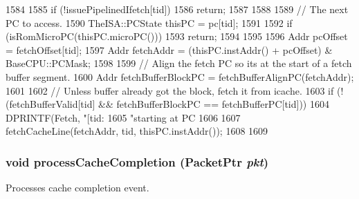 \begin{DoxyCode}
1584 {
1585     if (!issuePipelinedIfetch[tid]) {
1586         return;
1587     }
1588 
1589     // The next PC to access.
1590     TheISA::PCState thisPC = pc[tid];
1591 
1592     if (isRomMicroPC(thisPC.microPC())) {
1593         return;
1594     }
1595 
1596     Addr pcOffset = fetchOffset[tid];
1597     Addr fetchAddr = (thisPC.instAddr() + pcOffset) & BaseCPU::PCMask;
1598 
1599     // Align the fetch PC so its at the start of a fetch buffer segment.
1600     Addr fetchBufferBlockPC = fetchBufferAlignPC(fetchAddr);
1601 
1602     // Unless buffer already got the block, fetch it from icache.
1603     if (!(fetchBufferValid[tid] && fetchBufferBlockPC == fetchBufferPC[tid])) {
1604         DPRINTF(Fetch, "[tid:%
1605                 "starting at PC %
1606 
1607         fetchCacheLine(fetchAddr, tid, thisPC.instAddr());
1608     }
1609 }
\end{DoxyCode}
\hypertarget{classDefaultFetch_a3dc029c2e87eb911352b82ff15c86236}{
\subsubsection[{processCacheCompletion}]{\setlength{\rightskip}{0pt plus 5cm}void processCacheCompletion ({\bf PacketPtr} {\em pkt})}}
\label{classDefaultFetch_a3dc029c2e87eb911352b82ff15c86236}
Processes cache completion event. 


